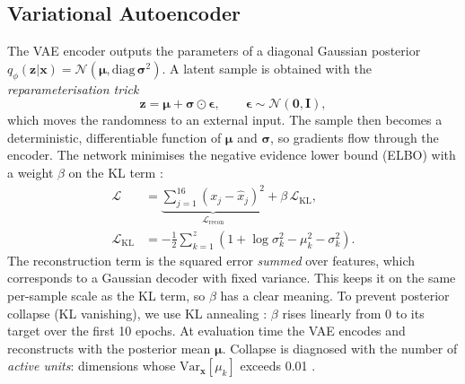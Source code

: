 \documentclass[conference]{IEEEtran}
\begin{document}
\begin{table}[t]
\caption{Network Architectures (ReLU Hidden Activations)}
\label{tab:arch}
\centering
{}
\end{table}

\subsection{Variational Autoencoder}
The VAE encoder outputs the parameters of a diagonal Gaussian posterior
$q_\phi(\mathbf z|\mathbf x)=\mathcal N(\bm\mu,\mathrm{diag}\,\bm\sigma^2)$. A latent sample
is obtained with the \emph{reparameterisation trick}
\begin{equation}
\mathbf z=\bm\mu+\bm\sigma\odot\bm\epsilon,\qquad \bm\epsilon\sim\mathcal N(\mathbf 0,\mathbf I),
\end{equation}
which moves the randomness to an external input. The sample then becomes a deterministic,
differentiable function of $\bm\mu$ and $\bm\sigma$, so gradients flow through the encoder.
The network minimises the negative evidence lower bound (ELBO) with a weight $\beta$ on the
KL term \cite{higgins2017}:
\begin{align}
\mathcal L &= \underbrace{\textstyle\sum_{j=1}^{16}(x_j-\hat x_j)^2}_{\mathcal L_{\text{recon}}}
 + \beta\,\mathcal L_{\text{KL}}, \\
\mathcal L_{\text{KL}} &= -\tfrac12\textstyle\sum_{k=1}^{z}\left(1+\log\sigma_k^2-\mu_k^2-\sigma_k^2\right).
\end{align}
The reconstruction term is the squared error \emph{summed} over features, which corresponds
to a Gaussian decoder with fixed variance. This keeps it on the same per-sample scale as the
KL term, so $\beta$ has a clear meaning. To prevent posterior collapse (KL vanishing), we use
KL annealing \cite{bowman2016}: $\beta$ rises linearly from 0 to its target over the first
10 epochs. At evaluation time the VAE encodes and reconstructs with the posterior mean
$\bm\mu$. Collapse is diagnosed with the number of \emph{active units}: dimensions whose
$\mathrm{Var}_{\mathbf x}[\mu_k]$ exceeds 0.01 \cite{burda2016}.
\end{document}
